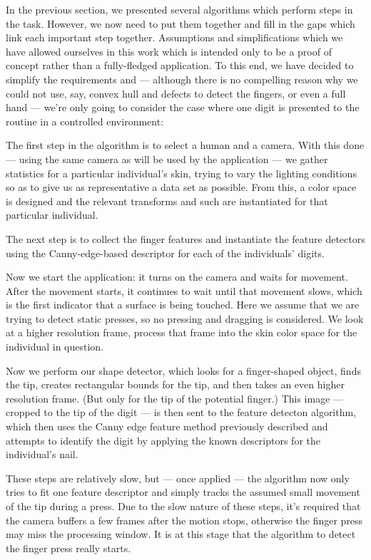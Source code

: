 In the previous section, we presented several algorithms which perform steps in the task. However, we now need to put them together and fill in the gaps which link each important step together. Assumptions and simplifications which we have allowed ourselves in this work which is intended only to be a proof of concept rather than a fully-fledged application. To this end, we have decided to simplify the requirements and --- although there is no compelling reason why we could not use, say, convex hull and defects to detect the fingers, or even a full hand --- we're only going to consider the case where one digit is presented to the routine in a controlled environment:

The first step in the algorithm is to select a human and a camera. With this done --- using the same camera as will be used by the application --- we gather statistics for a particular individual's skin, trying to vary the lighting conditions so as to give us as representative a data set as possible. From this, a color space is designed and the relevant transforms and such are instantiated for that particular individual.

The next step is to collect the finger features and instantiate the feature detectors using the Canny-edge-based descriptor for each of the individuals' digits.

Now we start the application: it turns on the camera and waits for movement. After the movement starts, it continues to wait until that movement slows, which is the first indicator that a surface is being touched. Here we assume that we are trying to detect static presses, so no pressing and dragging is considered. We look at a higher resolution frame, process that frame into the skin color space for the individual in question. 

Now we perform our shape detector, which looks for a finger-shaped object, finds the tip, creates rectangular bounds for the tip, and then takes an even higher resolution frame. (But only for the tip of the potential finger.) This image --- cropped to the tip of the digit --- is then sent to the feature detecton algorithm, which then uses the Canny edge feature method previously described and attempts to identify the digit by applying the known descriptors for the individual's nail.

These steps are relatively slow, but --- once applied --- the algorithm now only tries to fit one feature descriptor and simply tracks the assumed small movement of the tip during a press. Due to the slow nature of these steps, it's required that the camera buffers a few frames after the motion stops, otherwise the finger press may miss the processing window. It is at this stage that the algorithm to detect the finger press really starts.


